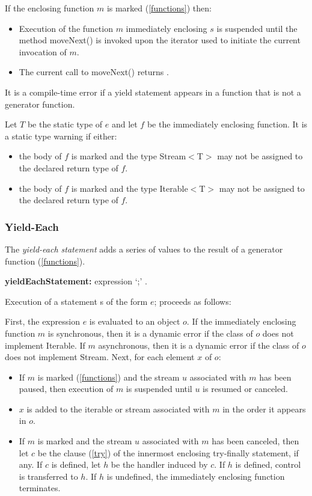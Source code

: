 \documentclass{article}
\newcommand{\code}[1]{{\sf #1}}
\begin{document}
\LMHash{}
If the enclosing function $m$ is marked \SYNC* (\ref{functions}) then:
\begin{itemize}
\item
Execution of the function $m$ immediately enclosing $s$ is suspended until the method \code{moveNext()} is invoked upon the iterator used to initiate the current invocation of $m$. 
\item
The current call to \code{moveNext()} returns \TRUE.
\end{itemize}

\LMHash{}
It is a compile-time error if a yield statement appears in a function that is not a generator function.

\LMHash{}
Let $T$ be the static type of $e$ and let $f$ be the immediately enclosing function.  It is a static type warning if either:
\begin{itemize}
\item
 the body of $f$ is marked \ASYNC* and the type \code{Stream$<$T$>$} may not be assigned to the declared return type of $f$. 
 \item
 the body of $f$ is marked \SYNC* and the type \code{Iterable$<$T$>$} may not be assigned to the declared return type of $f$.
 \end{itemize} 

 
 \subsubsection{ Yield-Each}
 
\LMHash{}
 The {\em yield-each statement} adds a series of values to the result of a generator function (\ref{functions}).
 
 \begin{grammar}
{\bf yieldEachStatement:}
   \YIELD* expression `{\escapegrammar ;}'
      .
\end{grammar}

\LMHash{}
Execution of a statement s of the form \code{\YIELD* $e$;}  proceeds as follows:

\LMHash{}
First, the expression $e$ is evaluated to an object $o$. If the immediately enclosing function $m$ is synchronous, then it is a dynamic error if the class of $o$ does not implement \code{Iterable}.  If $m$ asynchronous, then it is a dynamic error if the class of $o$ does not implement \code{Stream}. Next, for each element $x$ of $o$:
\begin{itemize}
\item
If $m$ is marked \ASYNC* (\ref{functions}) and the stream $u$ associated with $m$ has been paused,  then execution of $m$ is suspended until $u$ is resumed or canceled.
\item
 $x$ is added to the iterable or stream associated with $m$ in the order it appears in $o$.  
 \item
If $m$ is marked \ASYNC* and the stream $u$ associated with $m$ has been canceled, then let $c$ be the \FINALLY{} clause (\ref{try}) of the innermost enclosing try-finally statement, if any. If $c$ is defined,  let $h$ be the handler induced by $c$. If $h$ is defined, control is transferred to $h$. If $h$ is undefined, the immediately enclosing function terminates.
\end{itemize}
\end{document}
